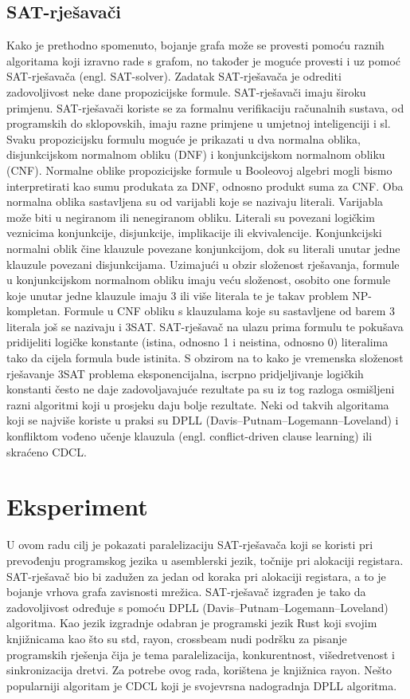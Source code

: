 \documentclass[conference]{IEEEtran}
\begin{document}
\subsection{SAT-rješavači}
Kako je prethodno spomenuto, bojanje grafa može se provesti pomoću raznih algoritama koji izravno rade s grafom, no također je moguće provesti i uz pomoć SAT-rješavača (engl. SAT-solver). Zadatak SAT-rješavača je odrediti zadovoljivost neke dane propozicijske formule. SAT-rješavači imaju široku primjenu. SAT-rješavači koriste se za formalnu verifikaciju računalnih sustava, od programskih do sklopovskih, imaju razne primjene u umjetnoj inteligenciji i sl. Svaku propozicijsku formulu moguće je prikazati u dva normalna oblika, disjunkcijskom normalnom obliku (DNF) i konjunkcijskom normalnom obliku (CNF). Normalne oblike propozicijske formule u Booleovoj algebri mogli bismo interpretirati kao sumu produkata za DNF, odnosno produkt suma za CNF. Oba normalna oblika sastavljena su od varijabli koje se nazivaju literali. Varijabla može biti u negiranom ili nenegiranom obliku. Literali su povezani logičkim veznicima konjunkcije, disjunkcije, implikacije ili ekvivalencije. Konjunkcijski normalni oblik čine klauzule povezane konjunkcijom, dok su literali unutar jedne klauzule povezani disjunkcijama. Uzimajući u obzir složenost rješavanja, formule u konjunkcijskom normalnom obliku imaju veću složenost, osobito one formule koje unutar jedne klauzule imaju 3 ili više literala te je takav problem NP-kompletan. Formule u CNF obliku s klauzulama koje su sastavljene od barem 3 literala još se nazivaju i 3SAT. SAT-rješavač na ulazu prima formulu te pokušava pridijeliti logičke konstante (istina, odnosno 1 i neistina, odnosno 0) literalima tako da cijela formula bude istinita. S obzirom na to kako je vremenska složenost rješavanje 3SAT problema eksponencijalna, iscrpno pridjeljivanje logičkih konstanti često ne daje zadovoljavajuće rezultate pa su iz tog razloga osmišljeni razni algoritmi koji u prosjeku daju bolje rezultate. Neki od takvih algoritama koji se najviše koriste u praksi su DPLL (Davis–Putnam–Logemann–Loveland) i konfliktom vođeno učenje klauzula (engl. conflict-driven clause learning) ili skraćeno CDCL.

\section{Eksperiment}

U ovom radu cilj je pokazati paralelizaciju SAT-rješavača koji se koristi pri prevođenju programskog jezika u asemblerski jezik, točnije pri alokaciji registara. SAT-rješavač bio bi zadužen za jedan od koraka pri alokaciji registara, a to je bojanje vrhova grafa zavisnosti mrežica. SAT-rješavač izgrađen je tako da zadovoljivost određuje s pomoću DPLL (Davis–Putnam–Logemann–Loveland) algoritma. Kao jezik izgradnje odabran je programski jezik Rust koji svojim knjižnicama kao što su std, rayon, crossbeam nudi podršku za pisanje programskih rješenja čija je tema paralelizacija, konkurentnost, višedretvenost i sinkronizacija dretvi. Za potrebe ovog rada, korištena je knjižnica rayon. Nešto popularniji algoritam je CDCL koji je svojevrsna nadogradnja DPLL algoritma.
\end{document}
